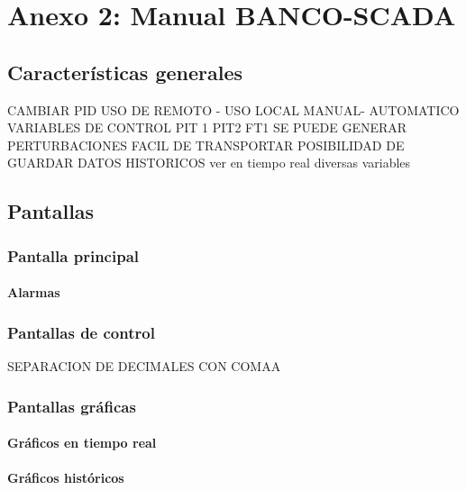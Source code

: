 


\section{Anexo 2: Manual BANCO-SCADA}
\subsection{Características generales}
CAMBIAR PID
USO DE REMOTO - USO LOCAL
MANUAL- AUTOMATICO
VARIABLES DE CONTROL PIT 1 PIT2 FT1
SE PUEDE GENERAR PERTURBACIONES 
FACIL DE TRANSPORTAR
POSIBILIDAD DE GUARDAR DATOS HISTORICOS
ver en tiempo real diversas variables
\subsection{Pantallas}
\subsubsection{Pantalla principal}
\paragraph{Alarmas}
\subsubsection{Pantallas de control}

SEPARACION DE DECIMALES CON COMAA
\subsubsection{Pantallas gráficas}
\paragraph{Gráficos en tiempo real}
\paragraph{Gráficos históricos}



\newpage